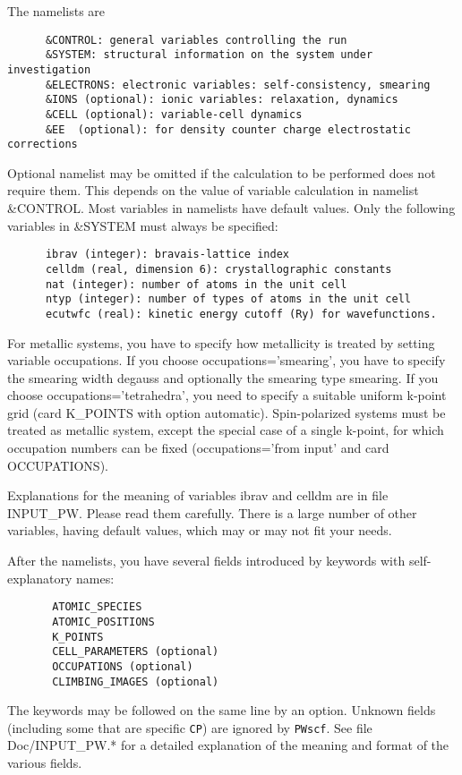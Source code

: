 \documentclass[12pt,a4paper]{article}
\def\PWscf{\texttt{PWscf}}
\def\CP{\texttt{CP}}
\begin{document}
The namelists are
\begin{verbatim}
      &CONTROL: general variables controlling the run
      &SYSTEM: structural information on the system under investigation
      &ELECTRONS: electronic variables: self-consistency, smearing
      &IONS (optional): ionic variables: relaxation, dynamics
      &CELL (optional): variable-cell dynamics
      &EE  (optional): for density counter charge electrostatic corrections
\end{verbatim}    
Optional namelist may be omitted if the calculation to be performed
does not require them. This depends on the value of variable calculation
in namelist \&CONTROL. Most variables in namelists have default values. Only
the following variables in \&SYSTEM must always be specified:
\begin{verbatim}
      ibrav (integer): bravais-lattice index
      celldm (real, dimension 6): crystallographic constants
      nat (integer): number of atoms in the unit cell
      ntyp (integer): number of types of atoms in the unit cell
      ecutwfc (real): kinetic energy cutoff (Ry) for wavefunctions.
\end{verbatim}    
For metallic systems, you have to specify how metallicity is treated
by setting 
variable occupations. If you choose occupations='smearing', you have
to specify the smearing width degauss and optionally the smearing type
smearing. If you choose occupations='tetrahedra', you need to specify 
a suitable uniform k-point grid (card K\_POINTS with option automatic).
Spin-polarized systems must be treated as metallic system, except the 
special case of a single k-point, for which occupation numbers can be fixed
(occupations='from input' and card OCCUPATIONS).
    
Explanations for the meaning of variables ibrav and celldm are in file
INPUT\_PW. Please read them carefully. There is a large number of other
variables, having default values, which may or may not fit your needs.
    
After the namelists, you have several fields introduced by keywords with
self-explanatory names:
\begin{verbatim}
       ATOMIC_SPECIES
       ATOMIC_POSITIONS
       K_POINTS
       CELL_PARAMETERS (optional)
       OCCUPATIONS (optional)
       CLIMBING_IMAGES (optional)
\end{verbatim}
The keywords may be followed on the same line by an option. Unknown
fields (including some that are specific \CP) are ignored by 
\PWscf.
See file Doc/INPUT\_PW.* for a detailed explanation of the meaning and format
of the various fields.
    
\end{document}
